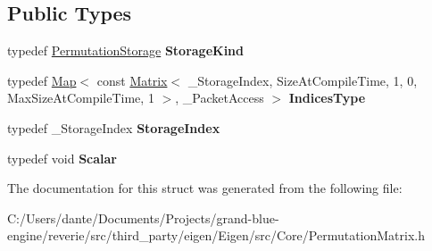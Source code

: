 \subsection*{Public Types}
\begin{DoxyCompactItemize}
\item 
\mbox{\label{struct_eigen_1_1internal_1_1traits_3_01_map_3_01_permutation_matrix_3_01_size_at_compile_time_0013e0044a37b24d59a079ebbe4c707a56_a8c23f3dffa6fe26633127245fa3b3f8c}} 
typedef \mbox{\hyperlink{struct_eigen_1_1_permutation_storage}{Permutation\+Storage}} {\bfseries Storage\+Kind}
\item 
\mbox{\label{struct_eigen_1_1internal_1_1traits_3_01_map_3_01_permutation_matrix_3_01_size_at_compile_time_0013e0044a37b24d59a079ebbe4c707a56_a6fb19f74cd0deba060753a58b3242745}} 
typedef \mbox{\hyperlink{class_eigen_1_1_map}{Map}}$<$ const \mbox{\hyperlink{class_eigen_1_1_matrix}{Matrix}}$<$ \+\_\+\+Storage\+Index, Size\+At\+Compile\+Time, 1, 0, Max\+Size\+At\+Compile\+Time, 1 $>$, \+\_\+\+Packet\+Access $>$ {\bfseries Indices\+Type}
\item 
\mbox{\label{struct_eigen_1_1internal_1_1traits_3_01_map_3_01_permutation_matrix_3_01_size_at_compile_time_0013e0044a37b24d59a079ebbe4c707a56_a32734b88c67df51aa9130d105243a279}} 
typedef \+\_\+\+Storage\+Index {\bfseries Storage\+Index}
\item 
\mbox{\label{struct_eigen_1_1internal_1_1traits_3_01_map_3_01_permutation_matrix_3_01_size_at_compile_time_0013e0044a37b24d59a079ebbe4c707a56_a3ddbd03c8a8cce2eaa370bdb38fe2b84}} 
typedef void {\bfseries Scalar}
\end{DoxyCompactItemize}


The documentation for this struct was generated from the following file\+:\begin{DoxyCompactItemize}
\item 
C\+:/\+Users/dante/\+Documents/\+Projects/grand-\/blue-\/engine/reverie/src/third\+\_\+party/eigen/\+Eigen/src/\+Core/Permutation\+Matrix.\+h\end{DoxyCompactItemize}
